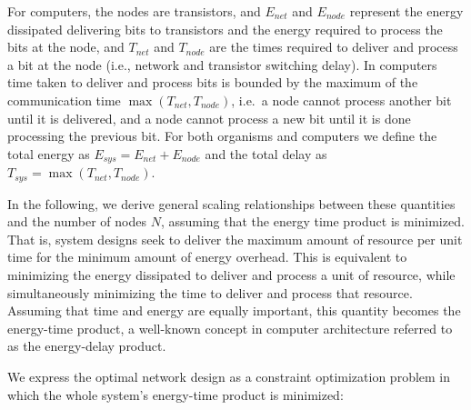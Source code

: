 \documentclass[12pt]{article}
\begin{document}
For computers, the nodes are transistors, and 
$E_{net}$ and $E_{node}$ represent the energy dissipated delivering bits to
transistors and the energy required to process the bits at the node, and
$T_{net}$ and $T_{node}$ are the times required to deliver and process a bit at
the node (i.e., network and transistor switching delay).  In computers time
taken to deliver and process bits is bounded by the maximum of the
communication time $\max(T_{net},T_{node})$, i.e.\ a node cannot process
another bit until it is delivered, and a node cannot process a new bit until it
is done processing the previous bit. For both organisms and computers we define
the total energy as $E_{sys} = E_{net} + E_{node}$ and the total delay as
$T_{sys} = \max(T_{net},T_{node})$.

In the following, we derive general scaling relationships between these
quantities and the number of nodes $N$, assuming that the energy time product
is minimized.  That is, system designs seek to deliver the maximum amount of
resource per unit time for the minimum amount of energy overhead.   This is
equivalent to minimizing the energy dissipated to deliver and process a unit of
resource, while simultaneously minimizing the time to deliver and process that
resource.  Assuming that time and energy are equally important, this quantity
becomes the energy-time product, a well-known concept in computer architecture
referred to as the energy-delay product.  


We express the optimal network design as a constraint optimization 
problem in which the whole system's energy-time product is minimized:
\end{document}
